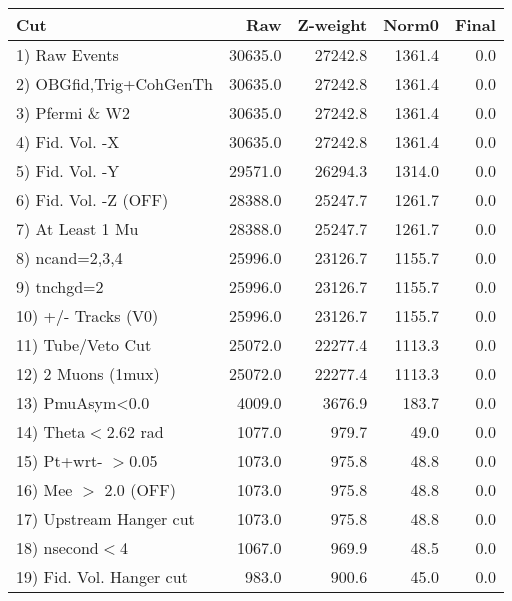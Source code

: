  \begin{table}[h!]\centering
 \begin{tabular}{||l||r|r|r|r||}
 \hline
 \hline
 Cut & Raw & Z-weight & Norm0 & Final \\
 \hline
  1) Raw Events           &     30635.0 &     27242.8 &      1361.4 &         0.0 \\
  2) OBGfid,Trig+CohGenTh &     30635.0 &     27242.8 &      1361.4 &         0.0 \\
  3) Pfermi \& W2         &     30635.0 &     27242.8 &      1361.4 &         0.0 \\
  4) Fid. Vol. -X         &     30635.0 &     27242.8 &      1361.4 &         0.0 \\
  5) Fid. Vol. -Y         &     29571.0 &     26294.3 &      1314.0 &         0.0 \\
  6) Fid. Vol. -Z (OFF)   &     28388.0 &     25247.7 &      1261.7 &         0.0 \\
  7) At Least 1 Mu        &     28388.0 &     25247.7 &      1261.7 &         0.0 \\
  8) ncand=2,3,4          &     25996.0 &     23126.7 &      1155.7 &         0.0 \\
  9) tnchgd=2             &     25996.0 &     23126.7 &      1155.7 &         0.0 \\
 10) +/- Tracks (V0)      &     25996.0 &     23126.7 &      1155.7 &         0.0 \\
 11) Tube/Veto Cut        &     25072.0 &     22277.4 &      1113.3 &         0.0 \\
 12) 2 Muons (1mux)       &     25072.0 &     22277.4 &      1113.3 &         0.0 \\
 13) PmuAsym<0.0          &      4009.0 &      3676.9 &       183.7 &         0.0 \\
 14) Theta$<$2.62 rad     &      1077.0 &       979.7 &        49.0 &         0.0 \\
 15) Pt+wrt- $>$0.05      &      1073.0 &       975.8 &        48.8 &         0.0 \\
 16) Mee $>$ 2.0  (OFF)   &      1073.0 &       975.8 &        48.8 &         0.0 \\
 17) Upstream Hanger cut  &      1073.0 &       975.8 &        48.8 &         0.0 \\
 18) nsecond$<$4          &      1067.0 &       969.9 &        48.5 &         0.0 \\
 19) Fid. Vol. Hanger cut &       983.0 &       900.6 &        45.0 &         0.0 \\

\end{tabular}
\end{table}
